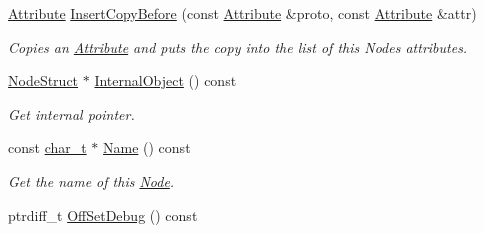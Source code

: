 \begin{DoxyCompactItemize}
\hyperlink{classMezzanine_1_1xml_1_1Attribute}{Attribute} \hyperlink{classMezzanine_1_1xml_1_1Node_a0daa45b11960680ce08a64b0258fb8ec}{InsertCopyBefore} (const \hyperlink{classMezzanine_1_1xml_1_1Attribute}{Attribute} \&proto, const \hyperlink{classMezzanine_1_1xml_1_1Attribute}{Attribute} \&attr)
\begin{DoxyCompactList}\small\item\em Copies an \hyperlink{classMezzanine_1_1xml_1_1Attribute}{Attribute} and puts the copy into the list of this Nodes attributes. \item\end{DoxyCompactList}\item 
\hyperlink{classNodeStruct}{NodeStruct} $\ast$ \hyperlink{classMezzanine_1_1xml_1_1Node_acf3d61683c8129573770386aba4259f7}{InternalObject} () const 
\begin{DoxyCompactList}\small\item\em Get internal pointer. \item\end{DoxyCompactList}\item 
const \hyperlink{namespaceMezzanine_1_1xml_a29b8a47c179e9895c4e9e66c45d1dbbc}{char\_\-t} $\ast$ \hyperlink{classMezzanine_1_1xml_1_1Node_a8b20d5b125625a218ece62d064396c4a}{Name} () const 
\begin{DoxyCompactList}\small\item\em Get the name of this \hyperlink{classMezzanine_1_1xml_1_1Node}{Node}. \item\end{DoxyCompactList}\item 
\hypertarget{classMezzanine_1_1xml_1_1Node_a42414021e87cadc815277d555fa7c3ab}{
ptrdiff\_\-t \hyperlink{classMezzanine_1_1xml_1_1Node_a42414021e87cadc815277d555fa7c3ab}{OffSetDebug} () const }
\label{classMezzanine_1_1xml_1_1Node_a42414021e87cadc815277d555fa7c3ab}


\end{DoxyCompactItemize}
